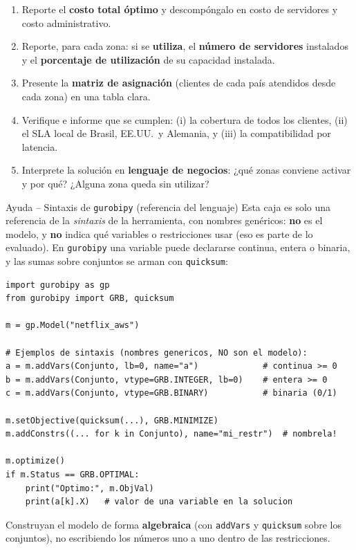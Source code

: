 \documentclass[12pt,a4paper]{article}
\begin{document}
\begin{enumerate}[label=\alph*), leftmargin=*, topsep=2pt]
    \item Reporte el \textbf{costo total óptimo} y descompóngalo en costo de
          servidores y costo administrativo.
    \item Reporte, para cada zona: si se \textbf{utiliza}, el \textbf{número de
          servidores} instalados y el \textbf{porcentaje de utilización} de su
          capacidad instalada.
    \item Presente la \textbf{matriz de asignación} (clientes de cada país
          atendidos desde cada zona) en una tabla clara.
    \item Verifique e informe que se cumplen: (i) la cobertura de todos los
          clientes, (ii) el SLA local de Brasil, EE.UU.\ y Alemania, y (iii) la
          compatibilidad por latencia.
    \item Interprete la solución en \textbf{lenguaje de negocios}: ¿qué zonas
          conviene activar y por qué? ¿Alguna zona queda sin utilizar?
\end{enumerate}

\begin{ayuda}{Ayuda -- Sintaxis de \texttt{gurobipy} (referencia del lenguaje)}
\vspace{2pt}
Esta caja es solo una referencia de la \emph{sintaxis} de la herramienta, con
nombres genéricos: \textbf{no} es el modelo, y \textbf{no} indica qué variables
o restricciones usar (eso es parte de lo evaluado). En \texttt{gurobipy} una
variable puede declararse continua, entera o binaria, y las sumas sobre
conjuntos se arman con \texttt{quicksum}:
\begin{lstlisting}
import gurobipy as gp
from gurobipy import GRB, quicksum

m = gp.Model("netflix_aws")

# Ejemplos de sintaxis (nombres genericos, NO son el modelo):
a = m.addVars(Conjunto, lb=0, name="a")             # continua >= 0
b = m.addVars(Conjunto, vtype=GRB.INTEGER, lb=0)    # entera >= 0
c = m.addVars(Conjunto, vtype=GRB.BINARY)           # binaria (0/1)

m.setObjective(quicksum(...), GRB.MINIMIZE)
m.addConstrs((... for k in Conjunto), name="mi_restr")  # nombrela!

m.optimize()
if m.Status == GRB.OPTIMAL:
    print("Optimo:", m.ObjVal)
    print(a[k].X)   # valor de una variable en la solucion
\end{lstlisting}
Construyan el modelo de forma \textbf{algebraica} (con \texttt{addVars} y
\texttt{quicksum} sobre los conjuntos), no escribiendo los números uno a uno
dentro de las restricciones.
\end{ayuda}
\end{document}
